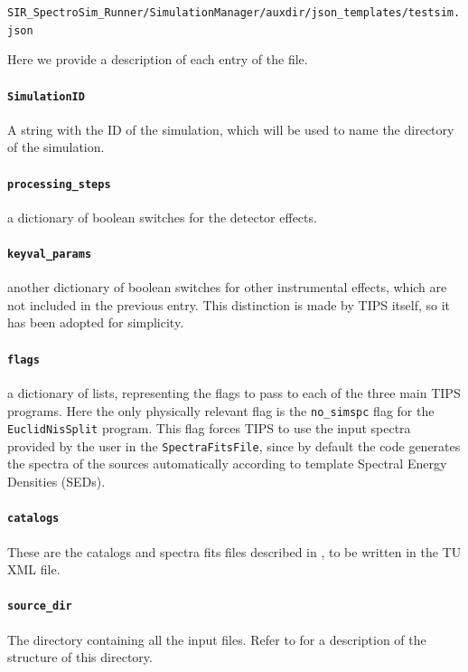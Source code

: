 \begin{center}
\verb+SIR_SpectroSim_Runner/SimulationManager/auxdir/json_templates/testsim.json+
\end{center}

Here we provide a description of each entry of the file.

\paragraph{\texttt{SimulationID}} A string with the ID of the simulation, which will be used to name the directory of the simulation.

\paragraph{\texttt{processing\_steps}} a dictionary of boolean switches for the detector effects.

\paragraph{\texttt{keyval\_params}} another dictionary of boolean switches for other instrumental effects, which are not included in the previous entry. This distinction is made by TIPS itself, so it has been adopted for simplicity.

\paragraph{\texttt{flags}} a dictionary of lists, representing the flags to pass to each of the three main TIPS programs. Here the only physically relevant flag is the \verb+no_simspc+ flag for the \verb+EuclidNisSplit+ program. This flag forces TIPS to use the input spectra provided by the user in the \verb+SpectraFitsFile+, since by default the code generates the spectra of the sources automatically according to template Spectral Energy Densities (SEDs).

\paragraph{\texttt{catalogs}} These are the catalogs and spectra fits files described in , to be written in the TU XML file.

\paragraph{\texttt{source\_dir}} The directory containing all the input files. Refer to  for a description of the structure of this directory.

